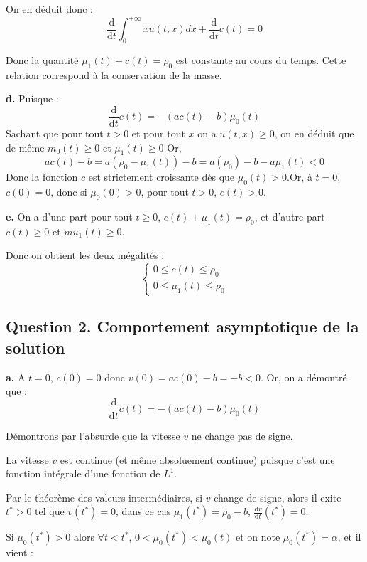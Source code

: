 \documentclass[a4paper]{article}
\newcommand{\dep}{b}
\begin{document}
On en déduit donc :
\[ \displaystyle \frac{\mathrm{d}}{\mathrm{d} t} \int_0^{+\infty} x u(t,x)dx
+ \frac{\mathrm{d}}{\mathrm{d} t} c(t) = 0 \]

Donc la quantité $\mu_1(t) +c(t) = \rho_0$ est constante au cours du temps.
Cette relation correspond à la conservation de la masse.

\textbf{d.} 
	Puisque :
	\[\displaystyle \frac{\mathrm{d}}{\mathrm{d} t} c(t) = -(ac(t)-b)\mu_0(t)\]
	Sachant que pour tout $t>0$ et pour tout $x$ on a $u(t,x)\geq 0$,
	on en déduit que de même $m_0(t) \geq 0$ et $\mu_1(t)\geq 0$
	Or, 
	\[ ac(t)-b = a(\rho_0 - \mu_1(t))-b = a(\rho_0)-b - a\mu_1(t) <0 \]
	Donc la fonction $c$ est strictement croissante dès que $\mu_0(t)>0$.Or, à $t=0$,   $c(0)=0$,
	donc si $\mu_0(0)>0$, pour tout $t>0$, $c(t)> 0$.

\textbf{e.}
On a d'une part pour tout $t\geq 0$, $c(t)+\mu_1(t) = \rho_0$, et d'autre part $c(t)\geq 0$ et $mu_1(t)\geq 0$.

Donc on obtient les deux inégalités :
\[
\begin{cases}
	0 \leq c(t) \leq \rho_0 \\
	0 \leq \mu_1(t) \leq \rho_0
\end{cases}
\]


\subsection*{Question 2. Comportement asymptotique de la solution}

\textbf{a.}
A $t=0$, $c(0) = 0$ donc $v(0) = ac(0) -b = -b <0$.
Or, on a démontré que :
\[\displaystyle \frac{\mathrm{d}}{\mathrm{d} t} c(t) = -(ac(t)-b)\mu_0(t)\]

Démontrons par l'absurde que la vitesse $v$ ne change pas de signe.

La vitesse $v$ est continue (et même absoluement continue)
puisque c'est une fonction intégrale d'une fonction de $L^1$.

Par le théorème des valeurs intermédiaires, si $v$ change de signe,
alors il exite $t^*>0$ tel que $v(t^*)= 0$, 
	dans ce cas $\mu_1(t^*)= \rho_0 -\dep $, 
	$\frac{\mathrm{d} v }{\mathrm{d}t} (t^*) = 0$.
	
	Si $\mu_0(t^*)>0$ alors $\forall t<t^*$, $0<\mu_0(t^*)<\mu_0(t)$ et on note $ \mu_0(t^*)= \alpha$, et il vient :
	
\end{document}
